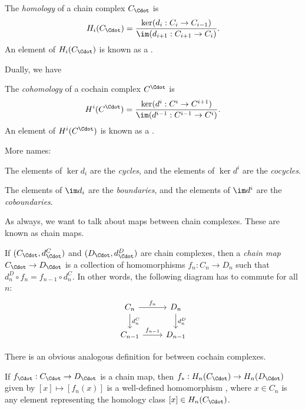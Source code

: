\documentclass[a4paper]{article}
\begin{document}
\begin{defi}[Homology]
  The \emph{homology} of a chain complex $C_{\Cdot}$ is
  \[
    H_i(C_{\Cdot}) = \frac{\ker (d_i: C_i \to C_{i - 1})}{\im (d_{i + 1}: C_{i + 1} \to C_i)}.
  \]
  An element of $H_i(C_{\Cdot})$ is known as a .
\end{defi}

Dually, we have
\begin{defi}[Cohomology]
  The \emph{cohomology} of a cochain complex $C^{\Cdot}$ is
  \[
    H^i(C^{\Cdot}) = \frac{\ker (d^i: C^i \to C^{i + 1})}{\im (d^{i - 1}: C^{i - 1} \to C^i)}.
  \]
  An element of $H^i(C^{\Cdot})$ is known as a .
\end{defi}

More names:
\begin{defi}
  The elements of $\ker d_i$ are the \emph{cycles}, and the elements of $\ker d^i$ are the \emph{cocycles}.
\end{defi}

\begin{defi}
  The elements of $\im d_i$ are the \emph{boundaries}, and the elements of $\im d^i$ are the \emph{coboundaries}.
\end{defi}

As always, we want to talk about maps between chain complexes. These are known as chain maps.
\begin{defi}
  If $(C_{\Cdot}, d_{\Cdot}^C)$ and $(D_{\Cdot}, d_{\Cdot}^D)$ are chain complexes, then a \emph{chain map} $C_{\Cdot} \to D_{\Cdot}$ is a collection of homomorphisms $f_n: C_n \to D_n$ such that $d_n^D \circ f_n = f_{n - 1} \circ d_n^C$. In other words, the following diagram has to commute for all $n$:
  \[
    \begin{tikzcd}
      C_n \ar[r, "f_n"] \ar[d, "d_n^C"] & D_n \ar[d, "d_n^D"]\\
      C_{n - 1} \ar[r, "f_{n - 1}"] & D_{n - 1}
    \end{tikzcd}
  \]
\end{defi}
There is an obvious analogous definition for  between cochain complexes.

\begin{lemma}
  If $f_{\Cdot}: C_{\Cdot} \to D_{\Cdot}$ is a chain map, then $f_*: H_n(C_{\Cdot}) \to H_n(D_{\Cdot})$ given by $[x] \mapsto [f_n(x)]$ is a well-defined homomorphism , where $x \in C_n$ is any element representing the homology class $[x] \in H_n(C_{\Cdot})$.
\end{lemma}
\end{document}
